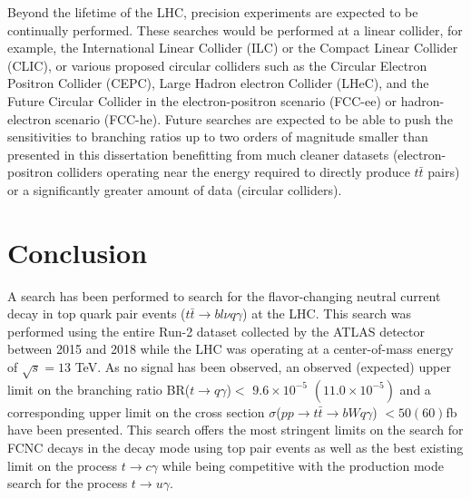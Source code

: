 Beyond the lifetime of the LHC, precision experiments are expected to be continually performed.  These searches would be performed at a linear collider, for example, the International Linear Collider (ILC)\cite{Buesser:2013pza} or the Compact Linear Collider (CLIC)\cite{Zarnecki:2018lup}, or various proposed circular colliders such as the Circular Electron Positron Collider (CEPC)\cite{CEPC-SPPCStudyGroup:2015csa}, Large Hadron electron Collider (LHeC)\cite{Bruning:2652313},  and the Future Circular Collider in the electron-positron scenario (FCC-ee) or hadron-electron scenario (FCC-he)\cite{Benedikt:2015kqj}.   Future searches are expected to be able to push the sensitivities to branching ratios up to two orders of magnitude smaller than presented in this dissertation\cite{Cakir:2018ruj} benefitting from much cleaner datasets (electron-positron colliders operating near the energy required to directly produce $t\bar{t}$ pairs) or a significantly greater amount of data (circular colliders).

\section{Conclusion}

A search has been performed to search for the flavor-changing neutral current decay in top quark pair events ($t\bar{t}\rightarrow bl\nu q \gamma$) at the LHC.  This search was performed using the entire Run-2 dataset collected by the ATLAS detector between 2015 and 2018 while the LHC was operating at a center-of-mass energy of $\sqrt{s}=13$ TeV.  As no signal has been observed, an observed (expected) upper limit on the branching ratio BR($t\rightarrow q \gamma$)$<$ $9.6\times10^{-5}$ $(11.0\times10^{-5})$ and a corresponding upper limit on the cross section $\sigma$($pp\rightarrow t\bar{t} \rightarrow bWq\gamma$) $< 50 (60)$fb have been presented.  This search offers the most stringent limits on the search for FCNC decays in the decay mode using top pair events as well as the best existing limit on the process $t\rightarrow c \gamma$ while being competitive with the production mode search for the process $t\rightarrow u \gamma$.

